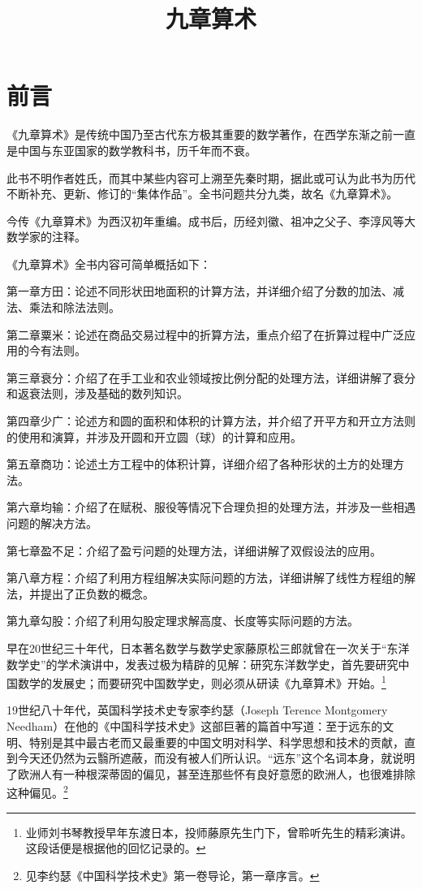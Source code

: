 \documentclass[a4paper,12pt,UTF8,twoside]{ctexbook}
\title{\heiti\zihao{0} 九章算术}
\author{}
\date{}
\begin{document}
\maketitle
\tableofcontents

\frontmatter
\chapter{前言}

《九章算术》是传统中国乃至古代东方极其重要的数学著作，在西学东渐之前一直是中国与东亚国家的数学教科书，历千年而不衰。

此书不明作者姓氏，而其中某些内容可上溯至先秦时期，据此或可认为此书为历代不断补充、更新、修订的“集体作品”。全书问题共分九类，故名《九章算术》。

今传《九章算术》为西汉初年重编。成书后，历经刘徽、祖冲之父子、李淳风等大数学家的注释。

《九章算术》全书内容可简单概括如下：

第一章方田：论述不同形状田地面积的计算方法，并详细介绍了分数的加法、减法、乘法和除法法则。

第二章粟米：论述在商品交易过程中的折算方法，重点介绍了在折算过程中广泛应用的今有法则。

第三章衰分：介绍了在手工业和农业领域按比例分配的处理方法，详细讲解了衰分和返衰法则，涉及基础的数列知识。

第四章少广：论述方和圆的面积和体积的计算方法，并介绍了开平方和开立方法则的使用和演算，并涉及开圆和开立圆（球）的计算和应用。

第五章商功：论述土方工程中的体积计算，详细介绍了各种形状的土方的处理方法。

第六章均输：介绍了在赋税、服役等情况下合理负担的处理方法，并涉及一些相遇问题的解决方法。

第七章盈不足：介绍了盈亏问题的处理方法，详细讲解了双假设法的应用。

第八章方程：介绍了利用方程组解决实际问题的方法，详细讲解了线性方程组的解法，并提出了正负数的概念。

第九章勾股：介绍了利用勾股定理求解高度、长度等实际问题的方法。

早在20世纪三十年代，日本著名数学与数学史家藤原松三郎就曾在一次关于“东洋数学史”的学术演讲中，发表过极为精辟的见解：研究东洋数学史，首先要研究中国数学的发展史；而要研究中国数学史，则必须从研读《九章算术》开始。\footnote{业师刘书琴教授早年东渡日本，投师藤原先生门下，曾聆听先生的精彩演讲。这段话便是根据他的回忆记录的。}

19世纪八十年代，英国科学技术史专家李约瑟（Joseph Terence Montgomery Needham）在他的《中国科学技术史》这部巨著的篇首中写道：至于远东的文明、特别是其中最古老而又最重要的中国文明对科学、科学思想和技术的贡献，直到今天还仍然为云翳所遮蔽，而没有被人们所认识。“远东”这个名词本身，就说明了欧洲人有一种根深蒂固的偏见，甚至连那些怀有良好意愿的欧洲人，也很难排除这种偏见。\footnote{见李约瑟《中国科学技术史》第一卷导论，第一章序言。}
\end{document}
